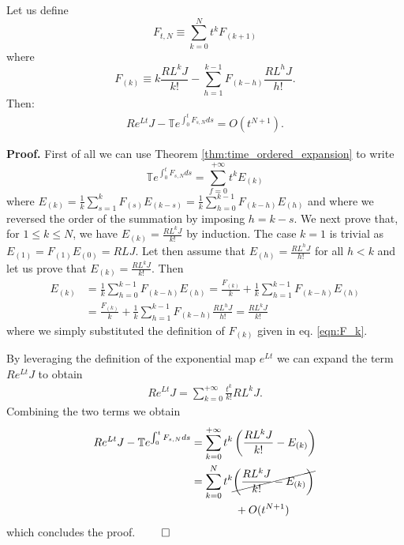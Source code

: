 \documentclass[twocolumn]{autart}    %
\newenvironment{proof}{\textbf{Proof.}}{\hfill $\qed$}
\newcommand{\Tb}{\mathbb{T}}
\begin{document}
\begin{thm}
\label{thm:approx}
Let us define 
\begin{equation}
F_{t,N} \equiv \sum_{k=0}^{N} t^k F_{(k+1)}
\label{eqn:poly_generator}
\end{equation}
where 
\begin{equation}
F_{(k)} \equiv k\frac{R L^k J}{k!} - \sum_{h=1}^{k-1}F_{(k-h)}\frac{R L^h J}{h!}.
\label{eqn:F_k}
\end{equation}
Then:
\begin{align}
R e^{L t}J - \Tb e^{\int_0^t F_{s,N} ds} = O(t^{N+1}).
\label{eqn:time_approx}
\end{align}
\end{thm}
\begin{proof}%
First of all we can use Theorem \ref{thm:time_ordered_expansion} to write 
\[\Tb e^{\int_0^t F_{s,N} ds} = \sum_{f=0}^{+\infty} t^k E_{(k)}\]
where \(E_{(k)} =  \frac{1}{k} \sum_{s=1}^{k} F_{(s)}E_{(k-s)}= \frac{1}{k}\sum_{h=0}^{k-1} F_{(k-h)}E_{(h)}\) and where we reversed the order of the summation by imposing $h=k-s$. We next prove that, for $1\leq k \leq N$, we have $E_{(k)}=\frac{RL^kJ}{k!}$ by induction. The case $k=1$ is trivial as $E_{(1)} = F_{(1)}E_{(0)} = RLJ$. Let then assume that $E_{(h)} = \frac{RL^hJ}{h!}$ for all $h<k$ and let us prove that $E_{(k)}=\frac{RL^k J}{k!}$. Then
\begin{align*}
    E_{(k)} &= \frac{1}{k}\sum_{h=0}^{k-1} F_{(k-h)}E_{(h)} = \frac{F_{(k)}}{k} + \frac{1}{k}\sum_{h=1}^{k-1}F_{(k-h)}E_{(h)}\\
    &= \frac{F_{(k)}}{k} + \frac{1}{k}\sum_{h=1}^{k-1}F_{(k-h)}\frac{RL^h J}{h!}
    = \frac{R L^k J}{k!}
\end{align*}
where we simply substituted the definition of $F_{(k)}$ given in eq. \eqref{eqn:F_k}.

By leveraging the definition of the exponential map $e^{L t}$ we can expand the term $R e^{L t}J$ to obtain
\begin{align*}
    R e^{L t} J = \sum_{k=0}^{+\infty} \frac{t^k}{k!} RL^k J.
\end{align*}
Combining the two terms we obtain
\begin{align*}
    R e^{L t}J - \Tb e^{\int_0^t F_{s,N} ds} &= \sum_{k=0}^{+\infty}t^k\left(\frac{RL^k J}{k!} - E_{(k)}\right) \\
    &= \sum_{k=0}^{N}t^k\cancel{\left(\frac{RL^k J}{k!} - E_{(k)}\right)}\\ &\qquad\qquad + O(t^{N+1})
\end{align*}
which concludes the proof.
\end{proof}
\end{document}
